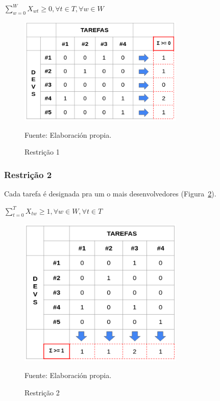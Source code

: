 \documentclass[12pt]{article}
\begin{document}
\begin{center}\Large
${\sum_{w=0}^{W} X_{wt} \geq 0} , \forall t \in T, \forall w \in W$
\end{center}

\begin{figure}[!ht]
	\begin{center}
		\includegraphics[width=0.7\textwidth]{images/constraint_1}
	\end{center}
	\begin{center}
		\caption{\label{figure:constraint_1}
			\small{Restrição 1}}
		{\small{Fuente: Elaboración propia.}}
	\end{center}
\end{figure}
 

\subsubsection{Restrição 2}

Cada tarefa é designada pra um o mais desenvolvedores (Figura~\ref{figure:constraint_2}).

\begin{center}\Large
	${\sum_{t=0}^{T} X_{tw} \geq 1}, \forall w \in W , \forall t \in T$
\end{center}

\begin{figure}[!ht]
	\begin{center}
		\includegraphics[width=0.7\textwidth]{images/constraint_2}
	\end{center}
	\begin{center}
		\caption{\label{figure:constraint_2}
			\small{Restrição 2}}
		{\small{Fuente: Elaboración propia.}}
	\end{center}
\end{figure}
\end{document}
